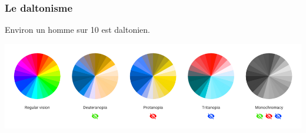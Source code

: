 \documentclass[aspectratio=169]{beamer}
\begin{document}
\begin{frame}[t]


\end{frame}

\begin{frame}[c]\frametitle{Le daltonisme}

Environ un homme sur 10 est daltonien. 

\begin{center}
  \includegraphics[width=1\textwidth]{figures/colorblindness-comparison.png}
\end{center}

\end{frame}
\end{document}
